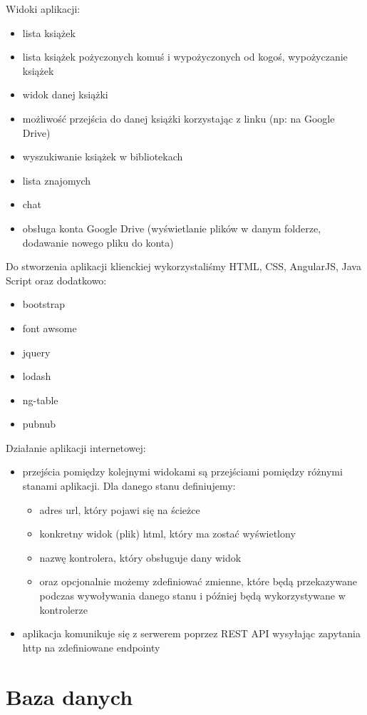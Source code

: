 \documentclass{report}
\begin{document}
\noindent
Widoki aplikacji:
\begin{itemize}
\item lista książek
\item lista książek pożyczonych komuś i wypożyczonych od kogoś, wypożyczanie książek
\item widok danej książki
\item możliwość przejścia do danej książki korzystając z linku (np: na Google Drive)
\item wyszukiwanie książek w bibliotekach
\item lista znajomych
\item chat
\item obsługa konta Google Drive (wyświetlanie plików w danym folderze, dodawanie nowego pliku do konta)
\end{itemize}
\noindent
Do stworzenia aplikacji klienckiej wykorzystaliśmy HTML, CSS, AngularJS, Java Script oraz dodatkowo:
\begin{itemize}
\item bootstrap
\item font awsome 
\item jquery
\item lodash
\item ng-table
\item pubnub
\end{itemize}
\noindent
Działanie aplikacji internetowej:
\begin{itemize}
\item przejścia pomiędzy kolejnymi widokami są przejściami pomiędzy różnymi stanami aplikacji. Dla danego stanu definiujemy:
	\begin{itemize}
	\item adres url, który pojawi się na ścieżce
	\item konkretny widok (plik) html, który ma zostać wyświetlony
	\item nazwę kontrolera, który obsługuje dany widok
	\item oraz opcjonalnie możemy zdefiniować zmienne, które będą przekazywane podczas wywoływania danego stanu i 	później będą wykorzystywane w kontrolerze
	\end{itemize}
\item aplikacja komunikuje się z serwerem poprzez REST API wysyłając zapytania http na zdefiniowane endpointy
\end{itemize}

	\section{Baza danych}
	
\end{document}

